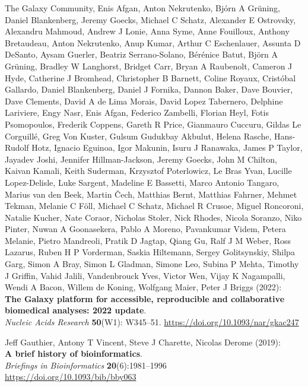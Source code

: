 \documentclass[10pt,letterpaper]{article}
\begin{document}
\begin{thebibliography}{10}
\begin{small}
The Galaxy Community, Enis Afgan, Anton Nekrutenko, Bjórn A Grüning, Daniel Blankenberg, Jeremy Goecks, Michael C Schatz, Alexander E Ostrovsky, Alexandru Mahmoud, Andrew J Lonie, Anna Syme, Anne Fouilloux, Anthony Bretaudeau, Anton Nekrutenko, Anup Kumar, Arthur C Eschenlauer, Assunta D DeSanto, Aysam Guerler, Beatriz Serrano-Solano, Bérénice Batut, Björn A Grüning, Bradley W Langhorst, Bridget Carr, Bryan A Raubenolt, Cameron J Hyde, Catherine J Bromhead, Christopher B Barnett, Coline Royaux, Cristóbal Gallardo, Daniel Blankenberg, Daniel J Fornika, Dannon Baker, Dave Bouvier, Dave Clements, David A de Lima Morais, David Lopez Tabernero, Delphine Lariviere, Engy Nasr, Enis Afgan, Federico Zambelli, Florian Heyl, Fotis Psomopoulos, Frederik Coppens, Gareth R Price, Gianmauro Cuccuru, Gildas Le Corguillé, Greg Von Kuster, Gulsum Gudukbay Akbulut, Helena Rasche, Hans-Rudolf Hotz, Ignacio Eguinoa, Igor Makunin, Isuru J Ranawaka, James P Taylor, Jayadev Joshi, Jennifer Hillman-Jackson, Jeremy Goecks, John M Chilton, Kaivan Kamali, Keith Suderman, Krzysztof Poterlowicz, Le Bras Yvan, Lucille Lopez-Delisle, Luke Sargent, Madeline E Bassetti, Marco Antonio Tangaro, Marius van den Beek, Martin Čech, Matthias Bernt, Matthias Fahrner, Mehmet Tekman, Melanie C Föll, Michael C Schatz, Michael R Crusoe, Miguel Roncoroni, Natalie Kucher, Nate Coraor, Nicholas Stoler, Nick Rhodes, Nicola Soranzo, Niko Pinter, Nuwan A Goonasekera, Pablo A Moreno, Pavankumar Videm, Petera Melanie, Pietro Mandreoli, Pratik D Jagtap, Qiang Gu, Ralf J M Weber, Ross Lazarus, Ruben H P Vorderman, Saskia Hiltemann, Sergey Golitsynskiy, Shilpa Garg, Simon A Bray, Simon L Gladman, Simone Leo, Subina P Mehta, Timothy J Griffin, Vahid Jalili, Vandenbrouck Yves, Victor Wen, Vijay K Nagampalli, Wendi A Bacon, Willem de Koning, Wolfgang Maier, Peter J Briggs (2022):\\
\textbf{The Galaxy platform for accessible, reproducible and collaborative biomedical analyses: 2022 update}.\\
\emph{Nucleic Acids Research} \textbf{50}(W1): W345--51.
\url{https://doi.org/10.1093/nar/gkac247}

Jeff Gauthier, Antony T Vincent, Steve J Charette, Nicolas Derome (2019):\\
\textbf{A brief history of bioinformatics}.\\
\emph{Briefings in Bioinformatics} \textbf{20}(6):1981–1996\\
\url{https://doi.org/10.1093/bib/bby063}


\end{small}
\end{thebibliography}
\end{document}
